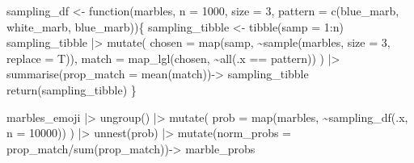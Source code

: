 \documentclass[
  letterpaper,
  DIV=11,
  numbers=noendperiod]{scrartcl}
\newenvironment{Shaded}{\begin{snugshade}}{\end{snugshade}}
\newcommand{\AttributeTok}[1]{\textcolor[rgb]{0.40,0.45,0.13}{#1}}
\newcommand{\ControlFlowTok}[1]{\textcolor[rgb]{0.00,0.23,0.31}{#1}}
\newcommand{\DecValTok}[1]{\textcolor[rgb]{0.68,0.00,0.00}{#1}}
\newcommand{\FunctionTok}[1]{\textcolor[rgb]{0.28,0.35,0.67}{#1}}
\newcommand{\NormalTok}[1]{\textcolor[rgb]{0.00,0.23,0.31}{#1}}
\newcommand{\OtherTok}[1]{\textcolor[rgb]{0.00,0.23,0.31}{#1}}
\newcommand{\SpecialCharTok}[1]{\textcolor[rgb]{0.37,0.37,0.37}{#1}}
\begin{document}
\begin{Shaded}
\begin{Highlighting}[]
\NormalTok{sampling\_df }\OtherTok{\textless{}{-}} \ControlFlowTok{function}\NormalTok{(marbles, }
                        \AttributeTok{n =} \DecValTok{1000}\NormalTok{, }
                        \AttributeTok{size =} \DecValTok{3}\NormalTok{, }
                        \AttributeTok{pattern =} \FunctionTok{c}\NormalTok{(blue\_marb, white\_marb, blue\_marb))\{}
\NormalTok{  sampling\_tibble }\OtherTok{\textless{}{-}} \FunctionTok{tibble}\NormalTok{(}\AttributeTok{samp =} \DecValTok{1}\SpecialCharTok{:}\NormalTok{n)   }
\NormalTok{  sampling\_tibble }\SpecialCharTok{|\textgreater{}} 
    \FunctionTok{mutate}\NormalTok{(}
      \AttributeTok{chosen =} \FunctionTok{map}\NormalTok{(samp, }
                   \SpecialCharTok{\textasciitilde{}}\FunctionTok{sample}\NormalTok{(marbles, }
                           \AttributeTok{size =} \DecValTok{3}\NormalTok{, }
                           \AttributeTok{replace =}\NormalTok{ T)),}
      \AttributeTok{match =} \FunctionTok{map\_lgl}\NormalTok{(chosen, }
                      \SpecialCharTok{\textasciitilde{}}\FunctionTok{all}\NormalTok{(.x }\SpecialCharTok{==}\NormalTok{ pattern))                 }
\NormalTok{    ) }\SpecialCharTok{|\textgreater{}} 
    \FunctionTok{summarise}\NormalTok{(}\AttributeTok{prop\_match =} \FunctionTok{mean}\NormalTok{(match))}\OtherTok{{-}\textgreater{}}                         
\NormalTok{    sampling\_tibble}
  \FunctionTok{return}\NormalTok{(sampling\_tibble)}
\NormalTok{\}}
\end{Highlighting}
\end{Shaded}

\begin{Shaded}
\begin{Highlighting}[]
\NormalTok{marbles\_emoji }\SpecialCharTok{|\textgreater{}} 
 \FunctionTok{ungroup}\NormalTok{() }\SpecialCharTok{|\textgreater{}} 
  \FunctionTok{mutate}\NormalTok{(}
    \AttributeTok{prob =} \FunctionTok{map}\NormalTok{(marbles, }\SpecialCharTok{\textasciitilde{}}\FunctionTok{sampling\_df}\NormalTok{(.x, }\AttributeTok{n =} \DecValTok{10000}\NormalTok{))}
\NormalTok{  ) }\SpecialCharTok{|\textgreater{}} 
  \FunctionTok{unnest}\NormalTok{(prob) }\SpecialCharTok{|\textgreater{}} 
  \FunctionTok{mutate}\NormalTok{(}\AttributeTok{norm\_probs =}\NormalTok{ prop\_match}\SpecialCharTok{/}\FunctionTok{sum}\NormalTok{(prop\_match))}\OtherTok{{-}\textgreater{}}
\NormalTok{  marble\_probs}
\end{Highlighting}
\end{Shaded}
\end{document}
